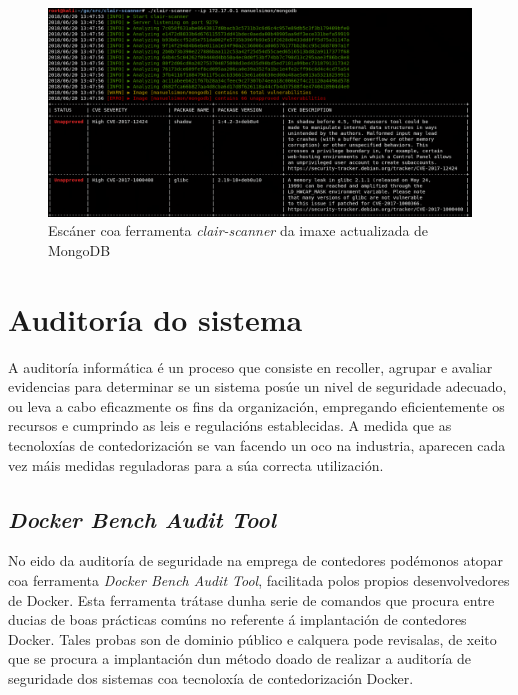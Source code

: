 \begin{figure}
\centerline{\includegraphics[width=15cm]{figuras/rep2.png}}
\caption{Escáner coa ferramenta \textit{clair-scanner} da imaxe actualizada de MongoDB}
\label{rep2}
\end{figure}

\section{Auditoría do sistema}

A auditoría informática é un proceso que consiste en recoller, agrupar e avaliar evidencias para determinar se un sistema posúe un nivel de seguridade adecuado, ou leva a cabo eficazmente os fins da organización, empregando eficientemente os recursos e cumprindo as leis e regulacións establecidas. A medida que as tecnoloxías de contedorización se van facendo un oco na industria, aparecen cada vez máis medidas reguladoras para a súa correcta utilización.\\

\subsection{\textit{Docker Bench Audit Tool}}
\label{DockerBeckAuditTool}

No eido da auditoría de seguridade na emprega de contedores podémonos atopar coa ferramenta \textit{Docker Bench Audit Tool}, facilitada polos propios desenvolvedores de Docker. Esta ferramenta trátase dunha serie de comandos que procura entre ducias de boas prácticas comúns no referente á implantación de contedores Docker. Tales probas son de dominio público e calquera pode revisalas, de xeito que se procura a implantación dun método doado de realizar a auditoría de seguridade dos sistemas coa tecnoloxía de contedorización Docker. \cite{docker-bench-security} \\

